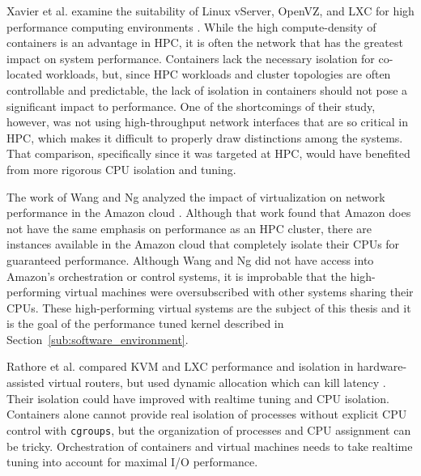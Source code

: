 Xavier et al. examine the suitability of Linux vServer, OpenVZ, and LXC for high performance computing environments \autocite{xavier2013performance}.
While the high compute-density of containers is an advantage in HPC, it is often the network that has the greatest impact on system performance.
Containers lack the necessary isolation for co-located workloads, but, since HPC workloads and cluster topologies are often controllable and predictable, the lack of isolation in containers should not pose a significant impact to performance.
One of the shortcomings of their study, however, was not using high-throughput network interfaces that are so critical in HPC, which makes it difficult to properly draw distinctions among the systems.
That comparison, specifically since it was targeted at HPC, would have benefited from more rigorous CPU isolation and tuning.  

The work of Wang and Ng analyzed the impact of virtualization on network performance in the Amazon cloud \autocite{wangAmazon2010}.
Although that work found that Amazon does not have the same emphasis on performance as an HPC cluster, there are instances available in the Amazon cloud that completely isolate their CPUs for guaranteed performance.  
Although Wang and Ng did not have access into Amazon's orchestration or control systems, it is improbable that the high-performing virtual machines were oversubscribed with other systems sharing their CPUs. 
These high-performing virtual systems are the subject of this thesis and it is the goal of the performance tuned kernel described in Section~\ref{sub:software_environment}.  

Rathore et al. compared KVM and LXC performance and isolation in hardware-assisted virtual routers, but used dynamic allocation which can kill latency \autocite{rathore2013kvm}.
Their isolation could have improved with realtime tuning and CPU isolation.  
Containers alone cannot provide real isolation of processes without explicit CPU control with \texttt{cgroups}, but the organization of processes and CPU assignment can be tricky.
Orchestration of containers and virtual machines needs to take realtime tuning into account for maximal I/O performance.

